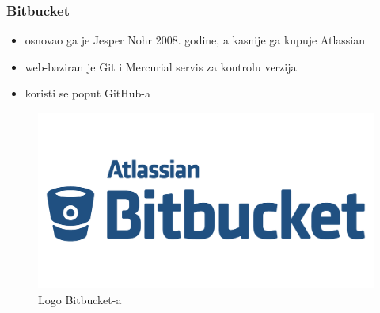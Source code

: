 \documentclass[12p, Times New Roman]{beamer}
\begin{document}
	\begin{frame}      			%
		\frametitle{Bitbucket}

		\begin{itemize}
			\item osnovao ga je Jesper Nohr 2008. godine, a kasnije ga kupuje Atlassian
			\item web-baziran je Git i Mercurial servis za kontrolu verzija
			\item koristi se poput GitHub-a

		\end{itemize}

		\begin{figure}[h!]
			\begin{center}
				\includegraphics[scale=0.04]{Bitbucket.png}
				\caption{Logo Bitbucket-a}
			\end{center}
		\end{figure}

	\end{frame}                
\end{document}
